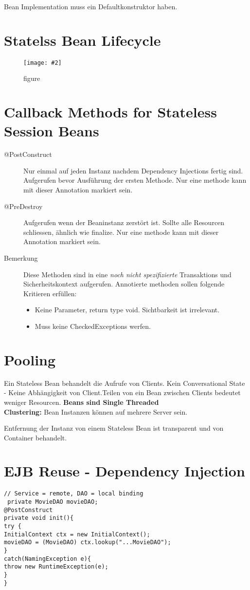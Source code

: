 \documentclass[a4paper,10pt]{scrreprt}
\newcommand{\pic}[2][figure]{\begin{figure}[h]
 \centering
 \texttt{[image: \#2]}
 \caption{#1}
\end{figure}
}
\begin{document}
\begin{framed}
 Bean Implementation muss ein Defaultkonstruktor haben. 
\end{framed}

\section{Statelss Bean Lifecycle}
\pic{slsbl.png}

\section{Callback Methods for Stateless Session Beans}
\begin{description}
 \item[@PostConstruct] Nur einmal auf jeden Instanz nachdem Dependency Injections fertig sind. Aufgerufen bevor Ausführung der ersten Methode. Nur eine methode kann mit dieser Annotation markiert sein.
 \item[@PreDestroy] Aufgerufen wenn der Beaninstanz zerstört ist. Sollte alle Resourcen schliessen, ähnlich wie finalize. Nur eine methode kann mit dieser Annotation markiert sein.
 \item[Bemerkung] Diese Methoden sind in eine \textit{noch nicht spezifizierte} Transaktions und Sicherheitskontext aufgerufen. Annotierte methoden sollen folgende Kritieren erfüllen: 
 \begin{itemize}
  \item Keine Parameter, return type void. Sichtbarkeit ist irrelevant.
  \item Muss keine CheckedExceptions werfen.
 \end{itemize}

\end{description}

\section{Pooling}
Ein Stateless Bean behandelt die Aufrufe von Clients. Kein Conversational State - Keine Abhängigkeit von 
Client.Teilen von ein Bean zwischen Clients bedeutet weniger Resourcen. \textbf{Beans sind Single Threaded}\\
\textbf{Clustering:} Bean Instanzen können auf mehrere Server sein.

Entfernung der Instanz von einem Stateless Bean ist transparent und von Container behandelt.


\section{EJB Reuse - Dependency Injection}
\begin{lstlisting}[caption=JNDI Lookup DI]
// Service = remote, DAO = local binding
 private MovieDAO movieDAO;
@PostConstruct
private void init(){
try {
InitialContext ctx = new InitialContext();
movieDAO = (MovieDAO) ctx.lookup("...MovieDAO");
}
catch(NamingException e){
throw new RuntimeException(e);
}
}
\end{lstlisting}
\end{document}
